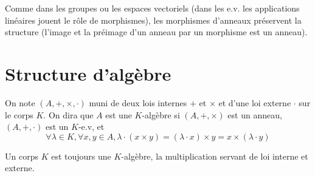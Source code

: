 Comme dans les groupes ou les espaces vectoriels (dans les e.v. les applications linéaires jouent le rôle de morphismes), les morphismes d'anneaux préservent la structure (l'image et la préimage d'un anneau par un morphisme est un anneau).

\section{Structure d'algèbre}

\begin{dfn}
    On note $(A, +, \times, \cdot)$ muni de deux lois internes $+$ et $\times$ et d'une loi externe $\cdot$ sur le corps $K$. On dira que $A$ est une $K$-algèbre si $(A, +,\times)$ est un anneau, $(A, +, \cdot)$ est un $K$-e.v, et \[
        \forall \lambda\in K, \forall x, y\in A, \lambda\cdot (x\times y)=(\lambda\cdot x)\times y=x\times (\lambda\cdot y)
    \]
\end{dfn}

\begin{rem}
    Un corps $K$ est toujours une $K$-algèbre, la multiplication servant de loi interne et externe.
\end{rem}
\endchapter
